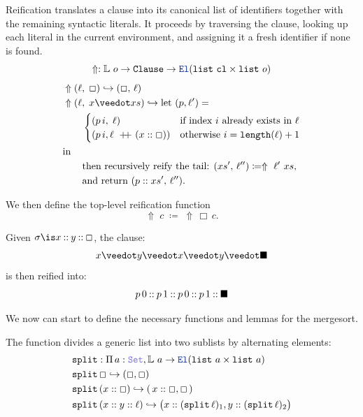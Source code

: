 \begin{definition}\label{def:reify}
Reification translates a clause into its canonical list of identifiers together with 
the remaining syntactic literals. It proceeds by traversing the clause, 
looking up each literal in the current environment, and assigning it a fresh identifier if none is found.
\[
  \Uparrow  : \bb{L}~o \to \kw{Clause} \to \el (\kw{list}~\kw{cl} \times \kw{list}~o)
\]
\begin{align*}
&\Uparrow (\ell,\;\Box) \re (\Box,\,\ell) \\
&\Uparrow (\ell,\; x \veedot xs) \re \text{let } (p, \ell') = \\
&\qquad\begin{cases}
  (p\,i ,\; \ell) & \text{if index }  i \text{ already exists in } \ell \\
  (p\,i, \ell \concat (x::\Box)) & \text{otherwise } i = \kw{length}(\ell) + 1
\end{cases} \\
&\text{in}\\
&\qquad \text{then recursively reify the tail: } (xs',\,\ell'') \coloneq \Uparrow~\ell'~xs, \\
&\qquad \text{and return } (p :: xs',\, \ell'').
\end{align*}

\noindent
We then define the top-level reification function
\[
  \Uparrow \;c \;\coloneqq\; \Uparrow \,\Box\,c.
\]
\end{definition}

\begin{example}[Reification]
Given $\sigma \is x \cons y \cons \Box$, the clause:
\[
    x \veedot y \veedot x \veedot y \veedot \nil 
\]
is then reified into:
\[
    p\,0 \mathbin{::} p\,1 \mathbin{::} p\,0 \mathbin{::} p\,1 \mathbin{::} \blacksquare
\]
\end{example}

We now can start to define the necessary functions and lemmas for the mergesort.

\begin{definition}[split]\label{def:split}
The function  divides a generic list into two sublists by alternating elements:
\begin{align*}
&\kw{split}: \Pi\,a:\set, \bb{L}~a \ra \el (\kw{list}~a \times \kw{list}~a)\\
&\kw{split}\,\Box \re (\Box , \Box) \\
&\kw{split}\,(x::\Box) \re (\,x::\Box , \Box\,) \\
&\kw{split}\,(x::y::\ell) \re \bigl(x::(\kw{split}\,\ell)_1, y::(\kw{split}\,\ell)_2 \bigr)
\end{align*}
\end{definition}

